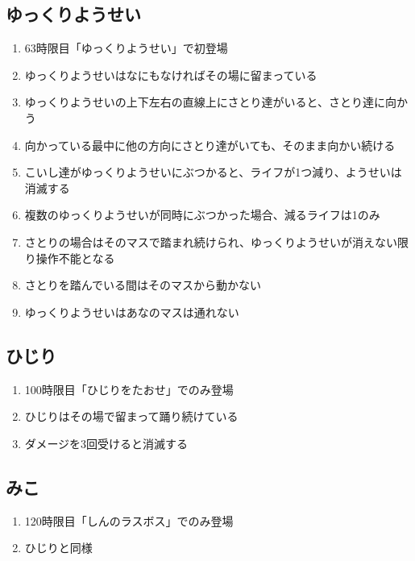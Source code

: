 \subsection{ゆっくりようせい}
\begin{enumerate}[label={\sarrow}]
\item 63時限目「ゆっくりようせい」で初登場
\item ゆっくりようせいはなにもなければその場に留まっている
\item ゆっくりようせいの上下左右の直線上にさとり達がいると、さとり達に向かう
\item 向かっている最中に他の方向にさとり達がいても、そのまま向かい続ける
\item こいし達がゆっくりようせいにぶつかると、ライフが1つ減り、ようせいは消滅する
\item 複数のゆっくりようせいが同時にぶつかった場合、減るライフは1のみ
\item さとりの場合はそのマスで踏まれ続けられ、ゆっくりようせいが消えない限り操作不能となる
\item さとりを踏んでいる間はそのマスから動かない
\item ゆっくりようせいはあなのマスは通れない
\end{enumerate}


\subsection{ひじり}
\begin{enumerate}[label={\sarrow}]
\item 100時限目「ひじりをたおせ」でのみ登場
\item ひじりはその場で留まって踊り続けている
\item ダメージを3回受けると消滅する
\end{enumerate}


\subsection{みこ}
\begin{enumerate}[label={\sarrow}]
\item 120時限目「しんのラスボス」でのみ登場
\item ひじりと同様
\end{enumerate}


